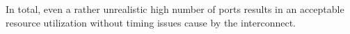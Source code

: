 In total, even a rather unrealistic high number of ports results in an
acceptable resource utilization without timing issues cause by the
interconnect.




